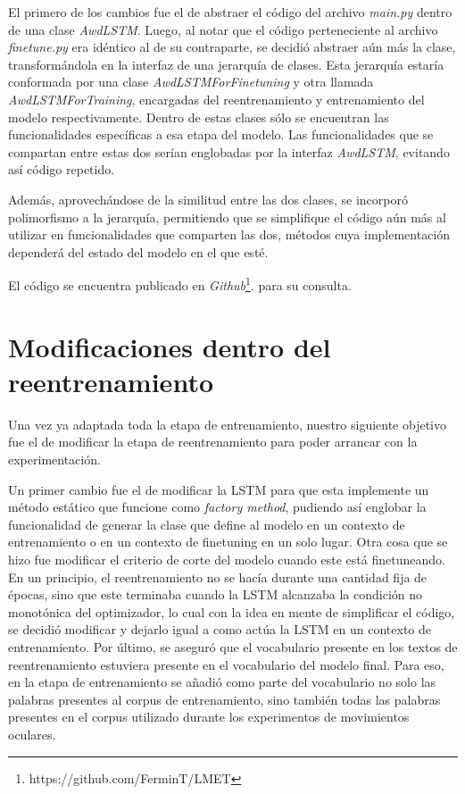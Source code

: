 El primero de los cambios fue el de abstraer el código del archivo \textit{main.py} dentro de una clase \textit{AwdLSTM}. Luego, al notar que el código perteneciente al archivo \textit{finetune.py} era idéntico al de su contraparte, se decidió abstraer aún más la clase, transformándola en la interfaz de una jerarquía de clases. Esta jerarquía estaría conformada por una clase \textit{AwdLSTMForFinetuning} y otra llamada \textit{AwdLSTMForTraining}, encargadas del reentrenamiento y entrenamiento del modelo respectivamente. Dentro de estas clases sólo se encuentran las funcionalidades específicas a esa etapa del modelo. Las funcionalidades que se compartan entre estas dos serían englobadas por la interfaz \textit{AwdLSTM}, evitando así código repetido.

Además, aprovechándose de la similitud entre las dos clases, se incorporó polimorfismo a la jerarquía, permitiendo que se simplifique el código aún más al utilizar en funcionalidades que comparten las dos, métodos cuya implementación dependerá del estado del modelo en el que esté.

El código se encuentra publicado en \textit{Github}\footnote{https://github.com/FerminT/LMET}. para su consulta.

\section{Modificaciones dentro del reentrenamiento}

Una vez ya adaptada toda la etapa de entrenamiento, nuestro siguiente objetivo fue el de modificar la etapa de reentrenamiento para poder arrancar con la experimentación.

Un primer cambio fue el de modificar la LSTM para que esta implemente un método estático que funcione como \textit{factory method}, pudiendo así englobar la funcionalidad de generar la clase que define al modelo en un contexto de entrenamiento o en un contexto de finetuning en un solo lugar.
Otra cosa que se hizo fue modificar el criterio de corte del modelo cuando este está finetuneando. En un principio, el reentrenamiento no se hacía durante una cantidad fija de épocas, sino que este terminaba cuando la LSTM alcanzaba la condición no monotónica del optimizador, lo cual con la idea en mente de simplificar el código, se decidió modificar y dejarlo igual a como actúa la LSTM en un contexto de entrenamiento.
Por último, se aseguró que el vocabulario presente en los textos de reentrenamiento estuviera presente en el vocabulario del modelo final. Para eso, en la etapa de entrenamiento se añadió como parte del vocabulario no solo las palabras presentes al corpus de entrenamiento, sino también todas las palabras presentes en el corpus utilizado durante los experimentos de movimientos oculares.



